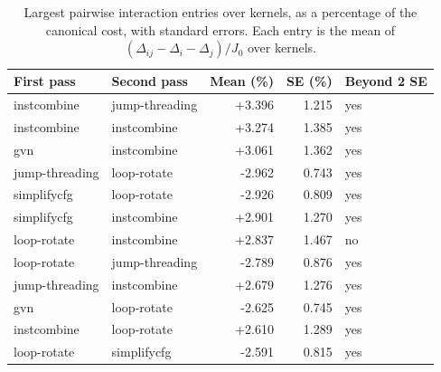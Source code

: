 \begin{table}[t]
\centering
\caption{Largest pairwise interaction entries over kernels, as a percentage of the canonical cost, with standard errors. Each entry is the mean of $(\Delta_{ij}-\Delta_i-\Delta_j)/J_0$ over kernels.}
\label{tab:interaction}
\setlength{\tabcolsep}{3pt}
\begin{tabular}{|l|l|r|r|l|}
\hline
First pass & Second pass & Mean (\%) & SE (\%) & Beyond 2 SE \\
\hline
instcombine & jump-threading & +3.396 & 1.215 & yes \\
\hline
instcombine & instcombine & +3.274 & 1.385 & yes \\
\hline
gvn & instcombine & +3.061 & 1.362 & yes \\
\hline
jump-threading & loop-rotate & -2.962 & 0.743 & yes \\
\hline
simplifycfg & loop-rotate & -2.926 & 0.809 & yes \\
\hline
simplifycfg & instcombine & +2.901 & 1.270 & yes \\
\hline
loop-rotate & instcombine & +2.837 & 1.467 & no \\
\hline
loop-rotate & jump-threading & -2.789 & 0.876 & yes \\
\hline
jump-threading & instcombine & +2.679 & 1.276 & yes \\
\hline
gvn & loop-rotate & -2.625 & 0.745 & yes \\
\hline
instcombine & loop-rotate & +2.610 & 1.289 & yes \\
\hline
loop-rotate & simplifycfg & -2.591 & 0.815 & yes \\
\hline
\end{tabular}
\end{table}
